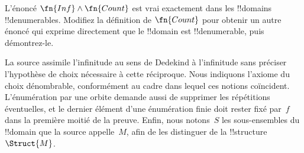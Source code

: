 \documentclass[../../../include/open-logic-section]{subfiles}
\begin{document}
\begin{prob}
L'énoncé $\fn{Inf}\land\fn{Count}$ est vrai
exactement dans les !!{domain}s
!!{denumerable}s. Modifiez la définition de
$\fn{Count}$ pour obtenir un autre énoncé
qui exprime directement que le !!{domain} est
!!{denumerable}, puis démontrez-le.
\end{prob}

\begin{editorial}
La source assimile l'infinitude au sens de Dedekind
à l'infinitude sans préciser l'hypothèse de choix
nécessaire à cette réciproque. Nous indiquons
l'axiome du choix dénombrable, conformément au
cadre dans lequel ces notions coïncident.
L'énumération par une orbite demande aussi de
supprimer les répétitions éventuelles, et le
dernier élément d'une énumération finie doit
rester fixé par~$f$ dans la première moitié de
la preuve. Enfin, nous notons~$S$ les
sous-ensembles du !!{domain} que la source
appelle~$M$, afin de les distinguer de la
!!{structure}~$\Struct{M}$.
\end{editorial}
\end{document}
